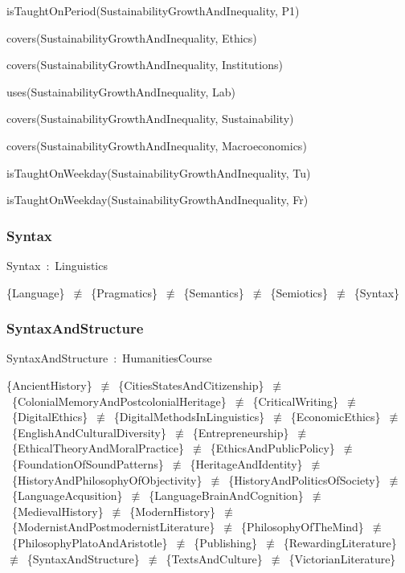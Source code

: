 \documentclass{article}
\begin{document}
isTaughtOnPeriod(SustainabilityGrowthAndInequality, P1)

covers(SustainabilityGrowthAndInequality, Ethics)

covers(SustainabilityGrowthAndInequality, Institutions)

uses(SustainabilityGrowthAndInequality, Lab)

covers(SustainabilityGrowthAndInequality, Sustainability)

covers(SustainabilityGrowthAndInequality, Macroeconomics)

isTaughtOnWeekday(SustainabilityGrowthAndInequality, Tu)

isTaughtOnWeekday(SustainabilityGrowthAndInequality, Fr)

\subsubsection*{Syntax}

Syntax~:~Linguistics

\{Language\}~\ensuremath{\not\equiv}~\{Pragmatics\}~\ensuremath{\not\equiv}~\{Semantics\}~\ensuremath{\not\equiv}~\{Semiotics\}~\ensuremath{\not\equiv}~\{Syntax\}

\subsubsection*{SyntaxAndStructure}

SyntaxAndStructure~:~HumanitiesCourse

\{AncientHistory\}~\ensuremath{\not\equiv}~\{CitiesStatesAndCitizenship\}~\ensuremath{\not\equiv}~\{ColonialMemoryAndPostcolonialHeritage\}~\ensuremath{\not\equiv}~\{CriticalWriting\}~\ensuremath{\not\equiv}~\{DigitalEthics\}~\ensuremath{\not\equiv}~\{DigitalMethodsInLinguistics\}~\ensuremath{\not\equiv}~\{EconomicEthics\}~\ensuremath{\not\equiv}~\{EnglishAndCulturalDiversity\}~\ensuremath{\not\equiv}~\{Entrepreneurship\}~\ensuremath{\not\equiv}~\{EthicalTheoryAndMoralPractice\}~\ensuremath{\not\equiv}~\{EthicsAndPublicPolicy\}~\ensuremath{\not\equiv}~\{FoundationOfSoundPatterns\}~\ensuremath{\not\equiv}~\{HeritageAndIdentity\}~\ensuremath{\not\equiv}~\{HistoryAndPhilosophyOfObjectivity\}~\ensuremath{\not\equiv}~\{HistoryAndPoliticsOfSociety\}~\ensuremath{\not\equiv}~\{LanguageAcqusition\}~\ensuremath{\not\equiv}~\{LanguageBrainAndCognition\}~\ensuremath{\not\equiv}~\{MedievalHistory\}~\ensuremath{\not\equiv}~\{ModernHistory\}~\ensuremath{\not\equiv}~\{ModernistAndPostmodernistLiterature\}~\ensuremath{\not\equiv}~\{PhilosophyOfTheMind\}~\ensuremath{\not\equiv}~\{PhilosophyPlatoAndAristotle\}~\ensuremath{\not\equiv}~\{Publishing\}~\ensuremath{\not\equiv}~\{RewardingLiterature\}~\ensuremath{\not\equiv}~\{SyntaxAndStructure\}~\ensuremath{\not\equiv}~\{TextsAndCulture\}~\ensuremath{\not\equiv}~\{VictorianLiterature\}
\end{document}
